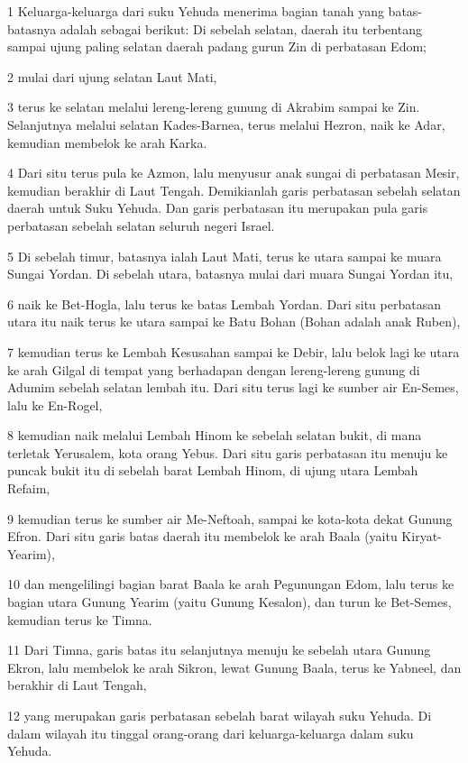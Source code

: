 \par 1 Keluarga-keluarga dari suku Yehuda menerima bagian tanah yang batas-batasnya adalah sebagai berikut: Di sebelah selatan, daerah itu terbentang sampai ujung paling selatan daerah padang gurun Zin di perbatasan Edom;
\par 2 mulai dari ujung selatan Laut Mati,
\par 3 terus ke selatan melalui lereng-lereng gunung di Akrabim sampai ke Zin. Selanjutnya melalui selatan Kades-Barnea, terus melalui Hezron, naik ke Adar, kemudian membelok ke arah Karka.
\par 4 Dari situ terus pula ke Azmon, lalu menyusur anak sungai di perbatasan Mesir, kemudian berakhir di Laut Tengah. Demikianlah garis perbatasan sebelah selatan daerah untuk Suku Yehuda. Dan garis perbatasan itu merupakan pula garis perbatasan sebelah selatan seluruh negeri Israel.
\par 5 Di sebelah timur, batasnya ialah Laut Mati, terus ke utara sampai ke muara Sungai Yordan. Di sebelah utara, batasnya mulai dari muara Sungai Yordan itu,
\par 6 naik ke Bet-Hogla, lalu terus ke batas Lembah Yordan. Dari situ perbatasan utara itu naik terus ke utara sampai ke Batu Bohan (Bohan adalah anak Ruben),
\par 7 kemudian terus ke Lembah Kesusahan sampai ke Debir, lalu belok lagi ke utara ke arah Gilgal di tempat yang berhadapan dengan lereng-lereng gunung di Adumim sebelah selatan lembah itu. Dari situ terus lagi ke sumber air En-Semes, lalu ke En-Rogel,
\par 8 kemudian naik melalui Lembah Hinom ke sebelah selatan bukit, di mana terletak Yerusalem, kota orang Yebus. Dari situ garis perbatasan itu menuju ke puncak bukit itu di sebelah barat Lembah Hinom, di ujung utara Lembah Refaim,
\par 9 kemudian terus ke sumber air Me-Neftoah, sampai ke kota-kota dekat Gunung Efron. Dari situ garis batas daerah itu membelok ke arah Baala (yaitu Kiryat-Yearim),
\par 10 dan mengelilingi bagian barat Baala ke arah Pegunungan Edom, lalu terus ke bagian utara Gunung Yearim (yaitu Gunung Kesalon), dan turun ke Bet-Semes, kemudian terus ke Timna.
\par 11 Dari Timna, garis batas itu selanjutnya menuju ke sebelah utara Gunung Ekron, lalu membelok ke arah Sikron, lewat Gunung Baala, terus ke Yabneel, dan berakhir di Laut Tengah,
\par 12 yang merupakan garis perbatasan sebelah barat wilayah suku Yehuda. Di dalam wilayah itu tinggal orang-orang dari keluarga-keluarga dalam suku Yehuda.
